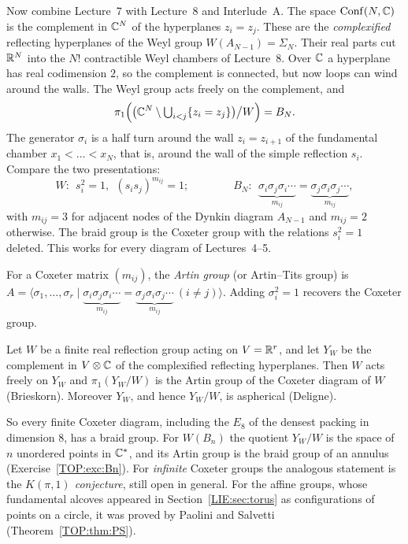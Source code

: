 Now combine Lecture~7 with Lecture~8 and Interlude~A. The space $\operatorname{Conf}(N,\mathbb{C})$ is the complement in $\mathbb{C}^N$ of the
hyperplanes $z_i=z_j$. These are the \emph{complexified} reflecting hyperplanes of the Weyl group
$W(A_{N-1})=\Sigma_N$. Their real parts cut $\mathbb{R}^N$ into the $N!$ contractible Weyl chambers of Lecture~8. Over $\mathbb{C}$
a hyperplane has real codimension $2$, so the complement is connected, but now loops can wind around the
walls. The Weyl group acts freely on the complement, and
\[
  \pi_1\Big(\big(\mathbb{C}^N\setminus\textstyle\bigcup_{i<j}\{z_i=z_j\}\big)\big/W\Big)=B_N .
\]
The generator $\sigma_i$ is a half turn around the wall $z_i=z_{i+1}$ of the fundamental chamber
$x_1<\dots<x_N$, that is, around the wall of the simple reflection $s_i$. Compare the two presentations:
\[
  W:\ \ s_i^2=1,\ \ (s_is_j)^{m_{ij}}=1;\qquad\qquad
  B_N:\ \ \underbrace{\sigma_i\sigma_j\sigma_i\cdots}_{m_{ij}}=\underbrace{\sigma_j\sigma_i\sigma_j\cdots}_{m_{ij}},
\]
with $m_{ij}=3$ for adjacent nodes of the Dynkin diagram $A_{N-1}$ and $m_{ij}=2$ otherwise. The braid
group is the Coxeter group with the relations $s_i^2=1$ deleted. This works for every diagram of
Lectures~4--5.

\begin{definition}
For a Coxeter matrix $(m_{ij})$, the \emph{Artin group} (or Artin--Tits group) is
$A=\langle\sigma_1,\dots,\sigma_r\mid\underbrace{\sigma_i\sigma_j\sigma_i\cdots}_{m_{ij}}=
\underbrace{\sigma_j\sigma_i\sigma_j\cdots}_{m_{ij}}\ (i\neq j)\rangle$. Adding $\sigma_i^2=1$ recovers the
Coxeter group.
\end{definition}

\begin{theorem}\label{TOP:thm:BD}
Let $W$ be a finite real reflection group acting on $V=\mathbb{R}^r$, and let $Y_W$ be the complement in $V\otimes\mathbb{C}$
of the complexified reflecting hyperplanes. Then $W$ acts freely on $Y_W$ and $\pi_1(Y_W/W)$ is the Artin
group of the Coxeter diagram of $W$ (Brieskorn). Moreover $Y_W$, and hence $Y_W/W$, is aspherical (Deligne).
\end{theorem}

So every finite Coxeter diagram, including the $E_8$ of the densest packing in dimension $8$, has a braid group. For
$W(B_n)$ the quotient $Y_W/W$ is the space of $n$ unordered points in $\mathbb{C}^*$, and its Artin group is the braid
group of an annulus (Exercise~\ref{TOP:exc:Bn}). For \emph{infinite} Coxeter groups the analogous statement
is the \emph{$K(\pi,1)$ conjecture}, still open in general. For the affine groups, whose fundamental
alcoves appeared in Section~\ref{LIE:sec:torus} as configurations of points on a circle, it was proved by
Paolini and Salvetti (Theorem~\ref{TOP:thm:PS}).

